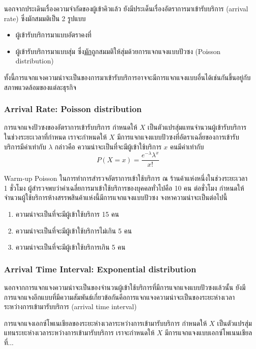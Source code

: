 นอกจากประเดินเรื่องความจำกัดของผู้เข้าคิวแล้ว ยังมีประเด็นเรื่องอัตราการมาเข้ารับบริการ (arrival rate) ซึ่งมักสมมติเป็น 2 รูปแบบ
\begin{itemize}
	\item ผู้เข้ารับบริการมาแบบอัตราคงที่
	\item ผู้เข้ารับบริการมาแบบสุ่ม ซึ่ง\underline{มัก}ถูกสมมติให้สุ่มด้วยการแจกแจงแบบปัวซง (Poisson distribution) 
\end{itemize}
ทั้งนี้การแจกแจงความน่าจะเป็นของการมาเข้ารับบริการอาจจะมีการแจกแจงแบบอื่นได้เช่นกันขึ้นอยู่กับสภาพแวดล้อมของแต่ละธุรกิจ

\subsubsection*{Arrival Rate: Poisson distribution}
\begin{property}
	{การแจกแจงปัวซงของอัตราการเข้ารับบริการ}{}
	กำหนดให้ $X$ เป็นตัวแปรสุ่มแทนจำนวนผู้เข้ารับบริการในช่วงระยะเวลาที่กำหนด เราจะกำหนดให้ $X$ มีการแจกแจงแบบปัวซงที่อัตราเฉลี่ยของการเข้ารับบริการมีค่าเท่ากับ $\lambda$ กล่าวคือ ความน่าจะเป็นที่จะมีผู้เข้าใช้บริการ $x$ คนมีค่าเท่ากับ
	$$
	P(X = x) = \frac{e^{-\lambda}\lambda^x}{x!}
	$$
\end{property}
\begin{example}
	{Warm-up Poisson}{}
	ในการทำการสำรวจอัตราการเข้าใช้บริการ ณ ร้านค้าแห่งหนึ่งในช่วงระยะเวลา 1 ชั่วโมง ผู้สำรวจพบว่าค่าเฉลี่ยการมาเข้าใช้บริการของบุคคลทั่วไปคือ 10 คน ต่อชั่วโมง กำหนดให้จำนวนผู้ใช้บริการห้างสรรพสินค้าแห่งนี้มีการแจกแจงแบบปัวซง จงหาความน่าจะเป็นต่อไปนี้
	\begin{enumerate}
		\item ความน่าจะเป็นที่จะมีผู้เข้าใช้บริการ 15 คน
		\item ความน่าจะเป็นที่จะมีผู้เข้าใช้บริการไม่เกิน 5 คน
		\item ความน่าจะเป็นที่จะมีผู้เข้าใช้บริการเกิน 5 คน
	\end{enumerate}
\end{example}
\newpage
\subsubsection*{Arrival Time Interval: Exponential distribution}
นอกจากการแจกแจงความน่าจะเป็นของจำนวนผู้เข้าใช้บริการที่มีการแจกแจงแบบปัวซงแล้วนั้น ยังมีการแจกแจงอีกแบบที่มีความสัมพันธ์เกี่ยวข้อกันคือการแจกแจงความน่าจะเป็นของระยะห่างเวลาระหว่างการเข้ามารับบริการ (arrival time interval)
\begin{property}
	{การแจกแจงเอกซ์โพเนเชียลของระยะห่างเวลาระหว่างการเข้ามารับบริการ}{}
	กำหนดให้ $X$ เป็นตัวแปรสุ่มแทนระยะห่างเวลาระหว่างการเข้ามารับบริการ เราจะกำหนดให้ $X$ มีการแจกแจงแบบเอกซ์โพเนนเชียลที่...
\end{property}


